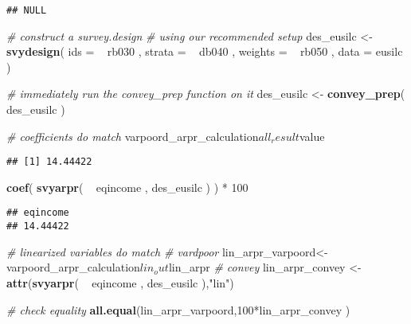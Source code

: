 \documentclass[]{book}
\newenvironment{Shaded}{\begin{snugshade}}{\end{snugshade}}
\newcommand{\KeywordTok}[1]{\textcolor[rgb]{0.13,0.29,0.53}{\textbf{{#1}}}}
\newcommand{\DataTypeTok}[1]{\textcolor[rgb]{0.13,0.29,0.53}{{#1}}}
\newcommand{\DecValTok}[1]{\textcolor[rgb]{0.00,0.00,0.81}{{#1}}}
\newcommand{\StringTok}[1]{\textcolor[rgb]{0.31,0.60,0.02}{{#1}}}
\newcommand{\CommentTok}[1]{\textcolor[rgb]{0.56,0.35,0.01}{\textit{{#1}}}}
\newcommand{\NormalTok}[1]{{#1}}
\theoremstyle{definition}
\theoremstyle{definition}
\theoremstyle{remark}
\begin{document}
\begin{verbatim}
## NULL
\end{verbatim}

\begin{Shaded}
\begin{Highlighting}[]
\CommentTok{# construct a survey.design}
\CommentTok{# using our recommended setup}
\NormalTok{des_eusilc <-}\StringTok{ }
\StringTok{    }\KeywordTok{svydesign}\NormalTok{( }
        \DataTypeTok{ids =} \NormalTok{~}\StringTok{ }\NormalTok{rb030 , }
        \DataTypeTok{strata =} \NormalTok{~}\StringTok{ }\NormalTok{db040 ,  }
        \DataTypeTok{weights =} \NormalTok{~}\StringTok{ }\NormalTok{rb050 , }
        \DataTypeTok{data =} \NormalTok{eusilc}
    \NormalTok{)}

\CommentTok{# immediately run the convey_prep function on it}
\NormalTok{des_eusilc <-}\StringTok{ }\KeywordTok{convey_prep}\NormalTok{( des_eusilc )}

\CommentTok{# coefficients do match}
\NormalTok{varpoord_arpr_calculation$all_result$value}
\end{Highlighting}
\end{Shaded}

\begin{verbatim}
## [1] 14.44422
\end{verbatim}

\begin{Shaded}
\begin{Highlighting}[]
\KeywordTok{coef}\NormalTok{( }\KeywordTok{svyarpr}\NormalTok{( ~}\StringTok{ }\NormalTok{eqincome , des_eusilc ) ) *}\StringTok{ }\DecValTok{100}
\end{Highlighting}
\end{Shaded}

\begin{verbatim}
## eqincome 
## 14.44422
\end{verbatim}

\begin{Shaded}
\begin{Highlighting}[]
\CommentTok{# linearized variables do match}
\CommentTok{# vardpoor}
\NormalTok{lin_arpr_varpoord<-}\StringTok{ }\NormalTok{varpoord_arpr_calculation$lin_out$lin_arpr}
\CommentTok{# convey }
\NormalTok{lin_arpr_convey <-}\StringTok{ }\KeywordTok{attr}\NormalTok{(}\KeywordTok{svyarpr}\NormalTok{( ~}\StringTok{ }\NormalTok{eqincome , des_eusilc ),}\StringTok{"lin"}\NormalTok{)}

\CommentTok{# check equality}
\KeywordTok{all.equal}\NormalTok{(lin_arpr_varpoord,}\DecValTok{100}\NormalTok{*lin_arpr_convey )}
\end{Highlighting}
\end{Shaded}
\end{document}
